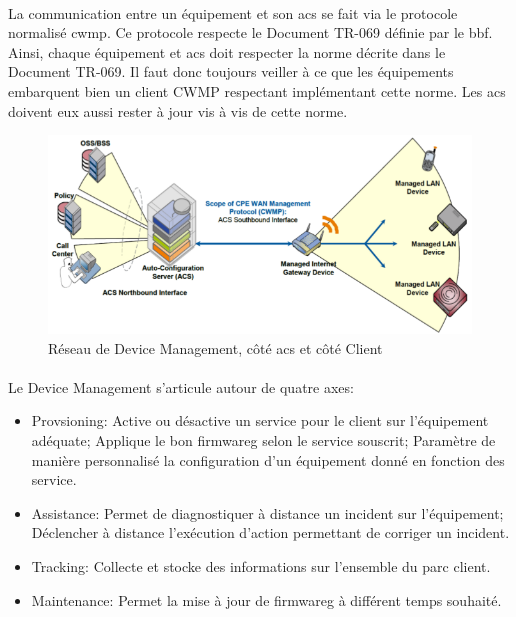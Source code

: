 \documentclass[12pt,a4paper]{report}
\begin{document}
\paragraph*{}
La communication entre un équipement et son \gls{acs} se fait via le protocole normalisé \gls{cwmp}. Ce protocole respecte le Document TR-069 définie par le \gls{bbf}. Ainsi, chaque équipement et \gls{acs} doit respecter la norme décrite dans le Document TR-069. Il faut donc toujours veiller à ce que les équipements embarquent bien un client CWMP respectant implémentant cette norme. Les \gls{acs}  doivent eux aussi rester à jour vis à vis de cette norme.
\begin{figure}[!ht]
    \center
    \includegraphics[scale=0.75]{./img/DM-TR-069-screen.png}
    \caption{Réseau de Device Management, côté \gls{acs} et côté Client}
\end{figure}
\paragraph*{}Le Device Management s'articule autour de quatre axes:
\begin{itemize}
\subparagraph*{}
\item Provsioning: Active ou désactive un service pour le client sur l'équipement adéquate; Applique le bon \gls{firmwareg} selon le service souscrit; Paramètre de manière personnalisé la configuration d'un équipement donné en fonction des service.
\item Assistance: Permet de diagnostiquer à distance un incident sur l'équipement; Déclencher à distance l'exécution d'action permettant de corriger un incident.
\item Tracking: Collecte et stocke des informations sur l'ensemble du parc client.
\item Maintenance: Permet la mise à jour de \gls{firmwareg} à différent temps souhaité.
\end{itemize}
\end{document}
